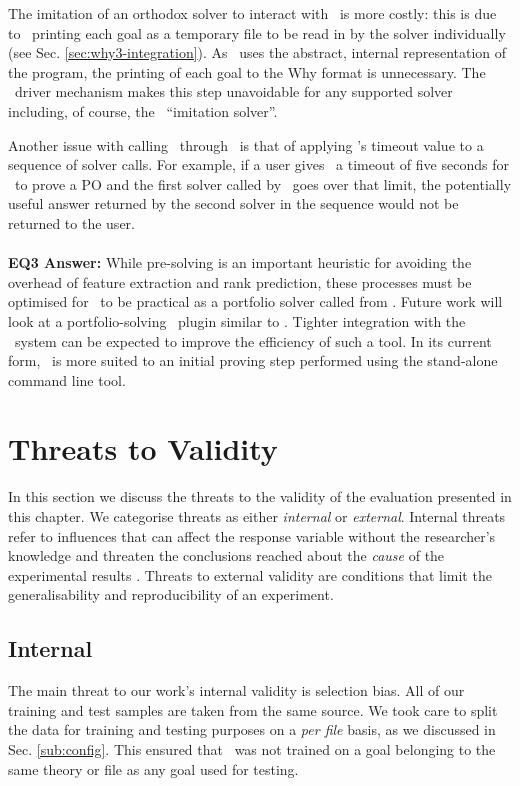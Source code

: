 The imitation of an orthodox solver to interact with \why~is more costly: this is due to \why~printing each goal as a temporary file to be read in by the solver individually (see Sec. \ref{sec:why3-integration}). 
As \where~uses the abstract, internal representation of the program, the printing of each goal to the Why format is unnecessary.
The \why~driver mechanism makes this step unavoidable for any supported solver including, of course, the \where~``imitation solver''.

Another issue with calling \where~through \why~is that of applying \why's timeout value to a sequence of solver calls. 
For example, if a user gives \why~a timeout of five seconds for \where~to prove a PO and the first solver called by \where~goes over that limit, the potentially useful answer returned by the second solver in the sequence would not be returned to the user. \\
\\
\textbf{EQ3 Answer:}
While pre-solving is an important heuristic for avoiding the overhead of feature extraction and rank prediction, these processes must be optimised for \where~to be practical as a portfolio solver called from \why.   
Future work will look at a portfolio-solving \why~plugin similar to \where. Tighter integration with the \why~system can be expected to improve the efficiency of such a tool.      
In its current form, \where~is more suited to an initial proving step performed using the stand-alone command line tool.

\section{Threats to Validity}
\label{sec:threats}

In this section we discuss the threats to the validity of the evaluation presented in this chapter.
We categorise threats as either \textit{internal} or \textit{external}.
Internal threats refer to influences that can affect the response variable without the researcher's knowledge and threaten the conclusions reached about the \textit{cause} of the experimental results \cite{experimentation}. 
Threats to external validity are conditions that limit the generalisability and reproducibility of an experiment. 

\subsection{Internal}

The main threat to our work's internal validity is selection bias. All of our training and test samples are taken from the same source. 
We took care to split the data for training and testing purposes on a \textit{per file} basis, as we discussed in Sec. \ref{sub:config}. 
This ensured that \where~was not trained on a goal belonging to the same theory or file as any goal used for testing.
 
